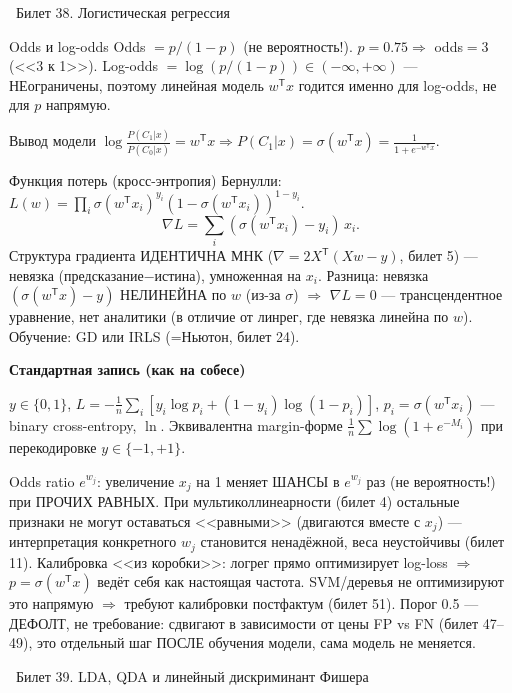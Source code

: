 \documentclass[12pt, a4paper]{article}
\newcommand{\bilet}[2]{%
  \vspace{10pt}%
  \noindent\colorbox{qcolor}{\parbox{\dimexpr\linewidth-2\fboxsep\relax}{%
    \color{white}\large\bfseries\strut\ Билет #1. #2%
  }}%
  \nopagebreak\vspace{5pt}\par\nopagebreak%
}
\newcommand{\qsub}[1]{%
  \vspace{5pt}%
  {\bfseries\color{defblue} #1}%
  \par\vspace{2pt}%
}
\newcommand{\tr}{^{\mathsf{T}}}
\begin{document}
\bilet{38}{Логистическая регрессия}

\begin{defbox}{Odds и log-odds}
Odds $=p/(1-p)$ (не вероятность!). $p=0.75\Rightarrow$ odds$=3$ (<<3 к 1>>). Log-odds $=\log(p/(1-p))\in(-\infty,+\infty)$ --- НЕограничены, поэтому линейная модель $w\tr x$ годится именно для log-odds, не для $p$ напрямую.
\end{defbox}

\begin{proofbox}{Вывод модели}
$\log\frac{P(C_1|x)}{P(C_0|x)}=w\tr x \Rightarrow P(C_1|x)=\sigma(w\tr x)=\frac{1}{1+e^{-w\tr x}}$.
\end{proofbox}

\begin{proofbox}{Функция потерь (кросс-энтропия)}
Бернулли: $L(w)=\prod_i \sigma(w\tr x_i)^{y_i}(1-\sigma(w\tr x_i))^{1-y_i}$.
\[
  \nabla L = \sum_i (\sigma(w\tr x_i) - y_i)\, x_i.
\]
Структура градиента ИДЕНТИЧНА МНК ($\nabla=2X\tr(Xw-y)$, билет 5) --- невязка (предсказание$-$истина), умноженная на $x_i$. Разница: невязка $(\sigma(w\tr x)-y)$ НЕЛИНЕЙНА по $w$ (из-за $\sigma$) $\Rightarrow$ $\nabla L=0$ --- трансцендентное уравнение, нет аналитики (в отличие от линрег, где невязка линейна по $w$). Обучение: GD или IRLS (=Ньютон, билет 24).
\end{proofbox}

\qsub{Стандартная запись (как на собесе)}
$y\in\{0,1\}$, $L=-\frac1n\sum_i[y_i\log p_i+(1-y_i)\log(1-p_i)]$, $p_i=\sigma(w\tr x_i)$ --- binary cross-entropy, $\ln$. Эквивалентна margin-форме $\frac1n\sum\log(1+e^{-M_i})$ при перекодировке $y\in\{-1,+1\}$.

\begin{fishkabox}
Odds ratio $e^{w_j}$: увеличение $x_j$ на 1 меняет ШАНСЫ в $e^{w_j}$ раз (не вероятность!) при ПРОЧИХ РАВНЫХ. При мультиколлинеарности (билет 4) остальные признаки не могут оставаться <<равными>> (двигаются вместе с $x_j$) --- интерпретация конкретного $w_j$ становится ненадёжной, веса неустойчивы (билет 11).
Калибровка <<из коробки>>: логрег прямо оптимизирует log-loss $\Rightarrow$ $p=\sigma(w\tr x)$ ведёт себя как настоящая частота. SVM/деревья не оптимизируют это напрямую $\Rightarrow$ требуют калибровки постфактум (билет 51).
Порог 0.5 --- ДЕФОЛТ, не требование: сдвигают в зависимости от цены FP vs FN (билет 47--49), это отдельный шаг ПОСЛЕ обучения модели, сама модель не меняется.
\end{fishkabox}

\bilet{39}{LDA, QDA и линейный дискриминант Фишера}
\end{document}
